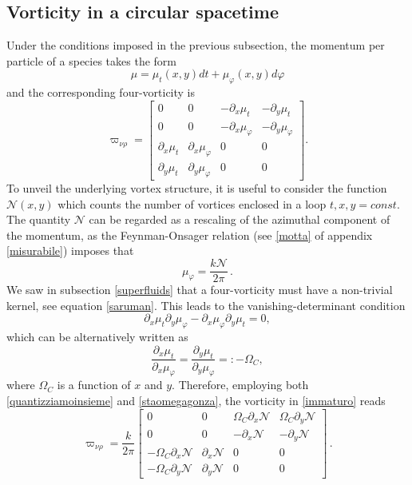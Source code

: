 \documentclass[usenatbib%
]{mnras}
\begin{document}
\subsection{Vorticity in a circular spacetime}\label{circularity}

Under the conditions imposed in the previous subsection, the momentum per particle of a species takes the form
\begin{equation}\label{ilmomentone}
\mu = \mu_t(x,y) dt + \mu_\varphi (x,y) d \varphi 
\end{equation}
and the corresponding four-vorticity is
\begin{equation}\label{immaturo}
\varpi_{\nu \rho} =
\begin{bmatrix}
  0  & 0 &  - \partial_x \mu_t &  -\partial_y \mu_t  \\
   0 & 0 & -\partial_x \mu_\varphi & -\partial_y \mu_\varphi  \\
    \partial_x \mu_t & \partial_x \mu_\varphi  & 0 & 0  \\
   \partial_y \mu_t & \partial_y \mu_\varphi & 0 & 0
\end{bmatrix}.
\end{equation} 
To unveil the underlying vortex structure, it is useful to consider  the function $\mathcal{N}(x,y)$ which counts the number of vortices enclosed in a loop $t,x,y=const$. 
The quantity $\mathcal{N}$ can be regarded as a rescaling of the azimuthal component of the momentum, as the Feynman-Onsager relation (see \eqref{motta} of appendix \ref{misurabile}) imposes that
\begin{equation}\label{quantizziamoinsieme}
\mu_\varphi = \dfrac{k\mathcal{N}}{2\pi} \, .
\end{equation}
We saw in subsection \ref{superfluids} that a four-vorticity  must have a non-trivial kernel, see equation \eqref{saruman}. This leads to the vanishing-determinant condition
\begin{equation}
\partial_x \mu_t \partial_y \mu_\varphi - \partial_x \mu_\varphi \partial_y \mu_t=0,
\end{equation} 
which can be alternatively written as
\begin{equation}\label{staomegagonza}
\dfrac{\partial_x \mu_t}{\partial_x \mu_\varphi} = \dfrac{\partial_y \mu_t}{\partial_y \mu_\varphi} =: -\Omega_C,
\end{equation}
where $\Omega_C$ is a function of $x$ and $y$. Therefore, employing both \eqref{quantizziamoinsieme} and \eqref{staomegagonza}, the vorticity in \eqref{immaturo} reads
\begin{equation}\label{maturo}
\varpi_{\nu \rho} = \dfrac{k}{2\pi}
\begin{bmatrix}
  0  & 0 &  \Omega_C  \partial_x \mathcal{N} &  \Omega_C  \partial_y \mathcal{N}  \\
   0 & 0 & -\partial_x \mathcal{N} & -\partial_y \mathcal{N}  \\
    -\Omega_C  \partial_x \mathcal{N} & \partial_x \mathcal{N}  & 0 & 0  \\
   -\Omega_C  \partial_y \mathcal{N} & \partial_y \mathcal{N} & 0 & 0
\end{bmatrix} \, .
\end{equation}
\end{document}
